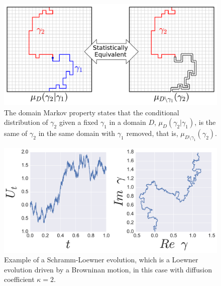 \begin{figure}
\begin{center}
    \includegraphics[width=\textwidth]{chapters/ch4-sle/figs/sle_dmp}
\end{center}
\caption{The domain Markov property states that the conditional distribution of
    $\gamma_2$ given a fixed $\gamma_1$ in a domain $D$,
    $\mu_D(\gamma_2|\gamma_1)$, is the same of $\gamma_2$ in the same domain
    with $\gamma_1$ removed, that is, $\mu_{D\setminus\gamma_1}(\gamma_2)$.}
\label{fig:dmp}
\end{figure}

\begin{figure}
\begin{center}
    \includegraphics[width=\textwidth]{chapters/ch4-sle/figs/sleexample}
\end{center}
\caption{Example of a Schramm-Loewner evolution, which is a Loewner evolution
    driven by a Browninan motion, in this case with diffusion coefficient
    $\kappa=2$.}
\label{fig:sleexample}
\end{figure}

